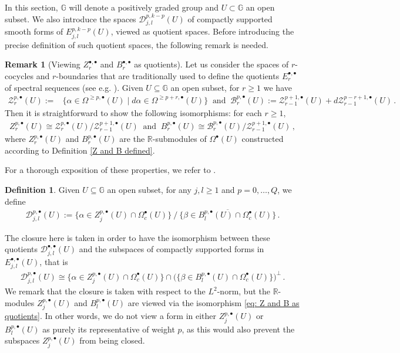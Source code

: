 \documentclass[dvipsnames]{amsart}
\theoremstyle{definition}
\newtheorem{definition}[theorem]{Definition}
\newtheorem{remark}[theorem]{Remark}
\theoremstyle{definition}
\numberwithin{equation}{section}
\newcommand{\R}{\mathbb{R}}
\newcommand{\G}{\mathbb{G}}
\begin{document}
In this section, $\G$ will denote a positively graded group and $U\subset\G$ an open subset. We also introduce the spaces ${\mathscr D}^{p,k-p}_{j,l}(U)$ of compactly supported smooth forms of $E^{p,k-p}_{j,l}(U)$, viewed as quotient spaces. Before introducing the precise definition of such quotient spaces, the following remark is needed.
\begin{remark}[Viewing $Z_r^{\bullet,\bullet}$ and $B_r^{\bullet,\bullet}$ as quotients]\label{remark:viewZandBas quotients}
    Let us consider the spaces of $r$-cocycles and $r$-boundaries that are traditionally used to define the quotients $E_r^{\bullet,\bullet}$ of spectral sequences (see e.g. \cite{mccleary2001user,livernet2020spectral}). Given $U\subseteq\G$ an open subset, for $r\ge 1$ we have
    \begin{align*}
        \mathcal{Z}_r^{p,\bullet}(U):=&\{\alpha\in\Omega^{\ge p,\bullet}(U)\mid d\alpha\in\Omega^{\ge p+r,\bullet}(U)\}\ \text{ and }\ 
        \mathcal{B}_r^{p,\bullet}(U):=\mathcal{Z}_{r-1}^{p+1,\bullet}(U)+d\mathcal{Z}_{r-1}^{p-r+1,\bullet}(U)\,.
    \end{align*}
    Then it is straightforward to show the following isomorphisms: for each $r\ge 1$, 
    \begin{align}\label{eq: Z and B as quotients}
        Z_r^{p,\bullet}(U)\cong \mathcal{Z}_r^{p,\bullet}(U)/\mathcal{Z}_{r-1}^{p+1,\bullet}(U)\ \text{ and }\ B_r^{p,\bullet}(U)\cong\mathcal{B}_r^{p,\bullet}(U)/\mathcal{Z}_{r-1}^{p+1,\bullet}(U)\,,
    \end{align}
    where $Z_r^{p,\bullet}(U)$ and $B_r^{p,\bullet}(U)$ are the $\R$-submodules of $\Omega^\bullet(U)$ constructed according to Definition \ref{Z and B defined}.

    For a thorough exposition of these properties, we refer to \cite{FILIPPA}.
\end{remark}
\begin{definition}Given $U\subseteq\G$ an open subset, for any $j,l\ge 1$ and $p=0,\ldots,Q$, we define
\begin{align*}
    \mathscr D_{j,l}^{p,\bullet}(U):={\{\alpha\in Z_j^{p,\bullet}(U)\cap \Omega_c^\bullet(U)\}}\ /\ \overline{\{\beta\in B_l^{p,\bullet}(U)\cap\Omega_c^\bullet(U)\}}\,.
\end{align*}
\end{definition}
 The closure here is taken in order to have the isomorphism between these quotients $\mathscr D_{j,l}^{\bullet,\bullet}(U)$ and the subspaces of compactly supported forms in $E_{j,l}^{\bullet,\bullet}(U)$, that is 
\begin{align*}
    \mathscr{D}_{j,l}^{p,\bullet}(U)\cong \{\alpha\in Z_j^{p,\bullet}(U)\cap \Omega_c^\bullet(U)\}\cap\big(\{\beta\in B_l^{p,\bullet}(U)\cap\Omega_c^\bullet(U)\}\big)^\perp\,.
\end{align*}
We remark that the closure is taken with respect to the $L^2$-norm, but the $\R$-modules $Z_j^{p,\bullet}(U)$ and $B_l^{p,\bullet}(U)$ are viewed via the isomorphism \eqref{eq: Z and B as quotients}. In other words, we do not view a form in either $Z_j^{p,\bullet}(U)$ or $B_l^{p,\bullet}(U)$ as purely its representative of weight $p$, as this would also prevent the subspaces $Z_j^{p,\bullet}(U)$ from being closed.
\end{document}
